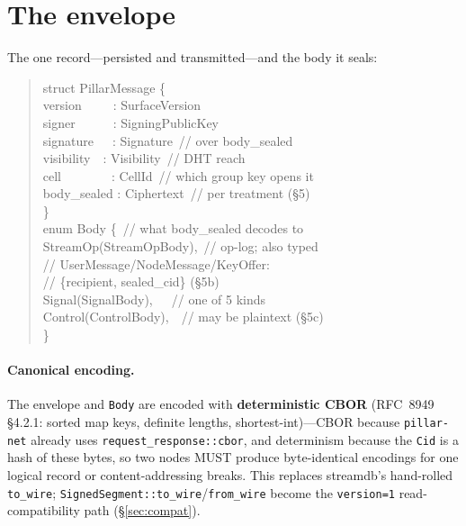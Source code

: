 \documentclass[10pt,twocolumn]{article}
\newcommand{\code}[1]{\texttt{\small #1}}
\newcommand{\Cid}{\code{Cid}}
\begin{document}
\section{The envelope}
The one record---persisted and transmitted---and the body it seals:
\begin{quote}\footnotesize\ttfamily
struct PillarMessage \{\\
\hspace*{1.2em}version\ \ \ \ \ : SurfaceVersion\\
\hspace*{1.2em}signer\ \ \ \ \ \ : SigningPublicKey\\
\hspace*{1.2em}signature\ \ \ : Signature\ // over body\_sealed\\
\hspace*{1.2em}visibility\ \ : Visibility\ // DHT reach\\
\hspace*{1.2em}cell\ \ \ \ \ \ \ \ : CellId\ // which group key opens it\\
\hspace*{1.2em}body\_sealed : Ciphertext\ // per treatment (\S5)\\
\}\\[3pt]
enum Body \{\ // what body\_sealed decodes to\\
\hspace*{1.2em}StreamOp(StreamOpBody),\ // op-log; also typed\\
\hspace*{3.0em}// UserMessage/NodeMessage/KeyOffer:\\
\hspace*{3.0em}// \{recipient, sealed\_cid\} (\S5b)\\
\hspace*{1.2em}Signal(SignalBody),\ \ \ // one of 5 kinds\\
\hspace*{1.2em}Control(ControlBody),\ \ // may be plaintext (\S5c)\\
\}
\end{quote}

\paragraph{Canonical encoding.} The envelope and \code{Body} are encoded with
\textbf{deterministic CBOR} (RFC~8949 \S4.2.1: sorted map keys, definite lengths,
shortest-int)---CBOR because \code{pillar-net} already uses
\code{request\_response::cbor}, and determinism because the \Cid{} is a hash of
these bytes, so two nodes MUST produce byte-identical encodings for one logical
record or content-addressing breaks. This replaces streamdb's hand-rolled
\code{to\_wire}; \code{SignedSegment::to\_wire}/\code{from\_wire} become the
\code{version=1} read-compatibility path (\S\ref{sec:compat}).
\end{document}
